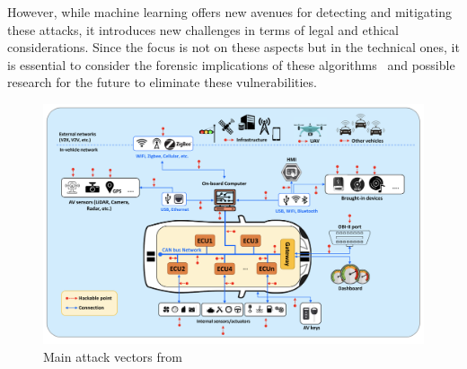 However, while machine learning offers new avenues for detecting and mitigating these attacks, it introduces new challenges in terms of legal and ethical considerations.
Since the focus is not on these aspects but in the technical ones, it is essential to consider the forensic implications
of these algorithms~\cite{durlik2022cybersecurity, cybersecurity2022forensics} and possible research for the future to eliminate these vulnerabilities.

\begin{figure}[!htb]
    \centering
    \includegraphics[width=0.7\linewidth]{figures/vectors}
    \caption{Main attack vectors from~\cite{bendiab2023autonomous}}
    \label{fig:attack-vectors}
\end{figure}